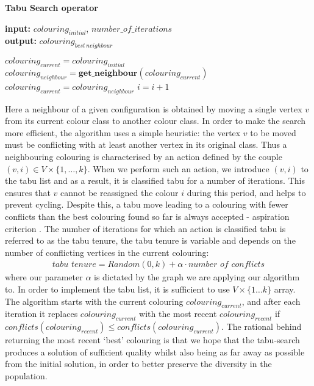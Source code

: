 \documentclass[12pt,a4paper]{article}
\begin{document}
\begin{algorithm}
  \caption*{\textbf{Tabu Search operator}}
  \textbf{input:} $colouring_{initial}$,\hspace{0.1cm}  $\textit{number\_of\_iterations}$\\
  \textbf{output:} $colouring_{best\,neighbour}$
  \begin{algorithmic}[1]
  	\State $colouring_{current} = colouring_{initial}$
  	\State $colouring_{neighbour} = \textbf{get\_neighbour}(colouring_{current})$
  	\State $colouring_{current} = colouring_{neighbour}$
  	\EndIf
  	\State $i = i + 1$
  	\EndWhile
  \end{algorithmic}
\end{algorithm}
 \par Here a neighbour of a given configuration is obtained by moving a single vertex $v$ from its current colour class to another colour class. In order to make the search more efficient, the algorithm uses a simple heuristic: the vertex $v$ to be moved must be conflicting with at least another vertex in its original class. Thus a neighbouring colouring is characterised by an action defined by the couple $(v, i) \in V \times \{1, \dots , k\}$. When we perform such an action, we introduce $(v, i)$ to the tabu list and as a result, it is classified tabu for a number of iterations. This ensures that $v$ cannot be reassigned the colour $i$ during this period, and helps to prevent cycling. Despite this, a tabu move leading to a colouring with fewer conflicts than the best colouring found so far is always accepted - aspiration criterion \cite{Hao}. The number of iterations for which an action is classified tabu is referred to as the tabu tenure, the tabu tenure is variable and depends on the number of conflicting vertices in the current colouring:
\begin{eqnarray*}
\textit{tabu tenure} = Random(0, k) + \alpha \cdot \textit{number of conflicts}
 \end{eqnarray*}
where our parameter $\alpha$ is dictated by the graph we are applying our algorithm to. In order to implement the tabu list, it is sufficient to use $V \times \{1 \dots k\}$ array. The algorithm starts with the current colouring $colouring_{current}$, and after each iteration it replaces $colouring_{current}$ with the most recent $colouring_{recent}$ if $conflicts(colouring_{recent}) \leq conflicts(colouring_{current})$. The rational behind returning the most recent `best' colouring is that we hope that the tabu-search produces a solution of sufficient quality whilst also being as far away as possible from the initial solution, in order to better preserve the diversity in the population.
\end{document}
